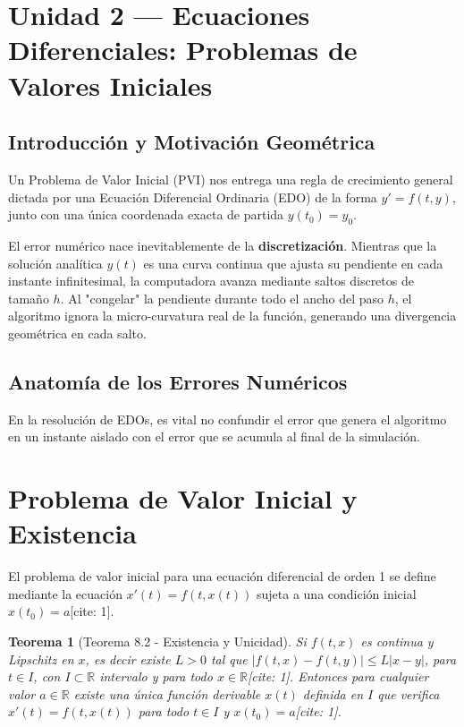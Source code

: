 \documentclass[12pt]{article}
\newtheorem{teorema}{Teorema}
\begin{document}
\section*{Unidad 2 — Ecuaciones Diferenciales: Problemas de Valores Iniciales}

\subsection*{Introducción y Motivación Geométrica}
Un Problema de Valor Inicial (PVI) nos entrega una regla de crecimiento general dictada por una Ecuación Diferencial Ordinaria (EDO) de la forma $y' = f(t,y)$, junto con una única coordenada exacta de partida $y(t_0) = y_0$. 

El error numérico nace inevitablemente de la \textbf{discretización}. Mientras que la solución analítica $y(t)$ es una curva continua que ajusta su pendiente en cada instante infinitesimal, la computadora avanza mediante saltos discretos de tamaño $h$. Al "congelar" la pendiente durante todo el ancho del paso $h$, el algoritmo ignora la micro-curvatura real de la función, generando una divergencia geométrica en cada salto.

\subsection*{Anatomía de los Errores Numéricos}

En la resolución de EDOs, es vital no confundir el error que genera el algoritmo en un instante aislado con el error que se acumula al final de la simulación.

\section*{Problema de Valor Inicial y Existencia}

El problema de valor inicial para una ecuación diferencial de orden 1 se define mediante la ecuación $x'(t) = f(t, x(t))$ sujeta a una condición inicial $x(t_0) = a$[cite: 1].

\begin{teorema}[Teorema 8.2 - Existencia y Unicidad]
Si $f(t, x)$ es continua y Lipschitz en $x$, es decir existe $L > 0$ tal que $|f(t, x) - f(t, y)| \le L|x - y|$, para $t \in I$, con $I \subset \mathbb{R}$ intervalo y para todo $x \in \mathbb{R}$[cite: 1]. Entonces para cualquier valor $a \in \mathbb{R}$ existe una única función derivable $x(t)$ definida en $I$ que verifica $x'(t) = f(t, x(t))$ para todo $t \in I$ y $x(t_0) = a$[cite: 1].
\end{teorema}
\end{document}
